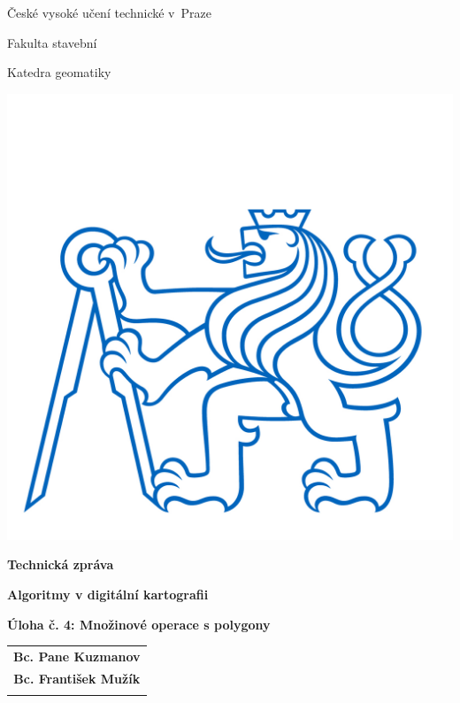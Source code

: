 \documentclass[a4paper, 12pt, oneside, titlepage]{article} %
\begin{document}
\setcounter{page}{1}   %
\thispagestyle{empty}

\begin{center}

\large

\v{C}eské vysoké učení technické v~Praze

\medskip

Fakulta stavební
\medskip

Katedra geomatiky

\vfill
\centerline{\mbox{\includegraphics[scale=1.3]{obrazky/symbol_cvut_konturova_verze.jpg}} }


{\bf\Large Technická zpráva}

\vfill

{\bf\LARGE\bfseries Algoritmy v digitální kartografii}

\vfill

{\bf\Large Úloha č. 4: Množinové operace s polygony}


\vfill



\vfill
\vspace{5mm}

\begin{tabular}{c}

{\bf Bc. Pane Kuzmanov}\\
\noalign{\vspace{2mm}}
{\bf Bc. František Mužík}\\
\noalign{\vspace{10mm}}


\end{tabular}
\end{center}
\end{document}
